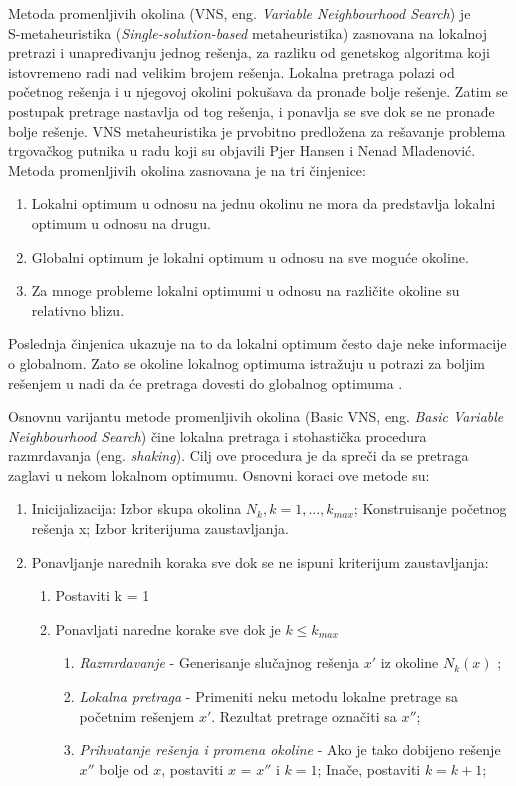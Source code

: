 \documentclass[main.tex]{subfiles}
\begin{document}
Metoda promenljivih okolina (VNS, eng. \textit{Variable Neighbourhood Search}) je \\ S-metaheuristika (\textit{Single-solution-based} metaheuristika) zasnovana na lokalnoj pretrazi i unapređivanju jednog rešenja, za razliku od genetskog algoritma koji istovremeno radi nad velikim brojem rešenja. Lokalna pretraga polazi od početnog rešenja i u njegovoj okolini pokušava da pronađe bolje rešenje. Zatim se postupak pretrage nastavlja od tog rešenja, i ponavlja se sve dok se ne pronađe bolje rešenje. VNS metaheuristika je prvobitno predložena za rešavanje problema trgovačkog putnika u radu \cite{vnsFirstPaper} koji su objavili Pjer Hansen i Nenad Mladenović. Metoda promenljivih okolina zasnovana je na tri činjenice:

\begin{enumerate}
  \item Lokalni optimum u odnosu na jednu okolinu ne mora da predstavlja lokalni optimum u odnosu na drugu.
  \item Globalni optimum je lokalni optimum u odnosu na sve moguće okoline.
  \item Za mnoge probleme lokalni optimumi u odnosu na različite okoline su relativno blizu.
\end{enumerate}

Poslednja činjenica ukazuje na to da lokalni optimum često daje neke informacije o globalnom. Zato se okoline lokalnog optimuma istražuju u potrazi za boljim rešenjem u nadi da će pretraga dovesti do globalnog optimuma \cite{vnsHandbook}.

Osnovnu varijantu metode promenljivih okolina (Basic VNS, eng. \textit{Basic Variable Neighbourhood Search}) čine lokalna pretraga i stohastička procedura razmrdavanja (eng. \textit{shaking}). Cilj ove procedura je da spreči da se pretraga zaglavi u nekom lokalnom optimumu. Osnovni koraci ove metode su:

\begin{enumerate}
  \item Inicijalizacija: Izbor skupa okolina $N_k, k = 1, ..., k_{max}$; Konstruisanje početnog rešenja x; Izbor kriterijuma zaustavljanja.
  \item Ponavljanje narednih koraka sve dok se ne ispuni kriterijum zaustavljanja:
  \begin{enumerate}
    \item Postaviti k = 1
    \item Ponavljati naredne korake sve dok je $k \leq k_{max}$
        \begin{enumerate}
        \item \textit{Razmrdavanje} - Generisanje slučajnog rešenja $x'$ iz okoline $N_k(x)$ ;
        \item \textit{Lokalna pretraga} - Primeniti neku metodu lokalne pretrage sa početnim rešenjem $x'$. Rezultat pretrage označiti sa $x''$;
        \item \textit{Prihvatanje rešenja i promena okoline} - Ako je tako dobijeno rešenje $x''$ bolje od  $x$, postaviti $x$ = $x''$ i  $k = 1$; Inače, postaviti $k = k + 1$;
      \end{enumerate}
  \end{enumerate}
\end{enumerate}
\end{document}
